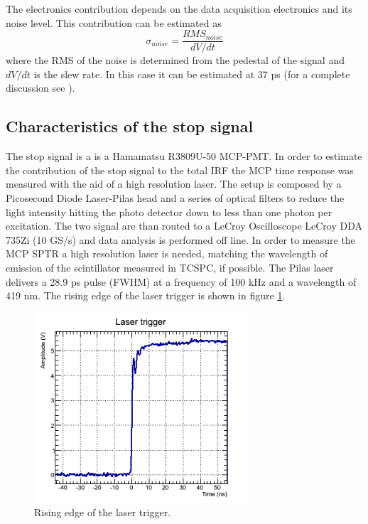 The electronics contribution depends on the data acquisition electronics and its noise level. This contribution can be estimated as
\begin{equation}
\sigma _{noise} = \frac{RMS _{noise}}{dV/dt}
\end{equation}
where the RMS of the noise is determined from the pedestal of the signal and $dV/dt$ is the slew rate. In this case it can be estimated at 37 ps (for a complete discussion see \cite{Gundacker2014}). 

\subsection{Characteristics of the stop signal}
The stop signal is a is a Hamamatsu R3809U-50 MCP-PMT. In order to estimate the contribution of the stop signal to the total IRF the MCP time response was measured with the aid of a high resolution laser.
The setup is composed by a Picosecond Diode Laser-Pilas head and a series of optical filters to reduce the light intensity hitting the photo detector down to less than one photon per excitation. The two signal are than routed to a LeCroy Oscilloscope LeCroy DDA 735Zi (10 GS/s) and data analysis is performed off line.
In order to measure the MCP SPTR a high resolution laser is needed, matching the wavelength of emission of the scintillator measured in TCSPC, if possible. The Pilas laser delivers a 28.9 ps pulse (FWHM) at a frequency of 100 kHz and a wavelength of 419 nm. The rising edge of the laser trigger is shown in figure \ref{fig:trigger}.
\begin{figure}[htbp]
\begin{center}
\includegraphics[width=8cm]{../Pictures/Chapter_8/laser_trigger.png}
\end{center}
\caption[Laser trigger]{Rising edge of the laser trigger.}
\label{fig:trigger}
\end{figure}
